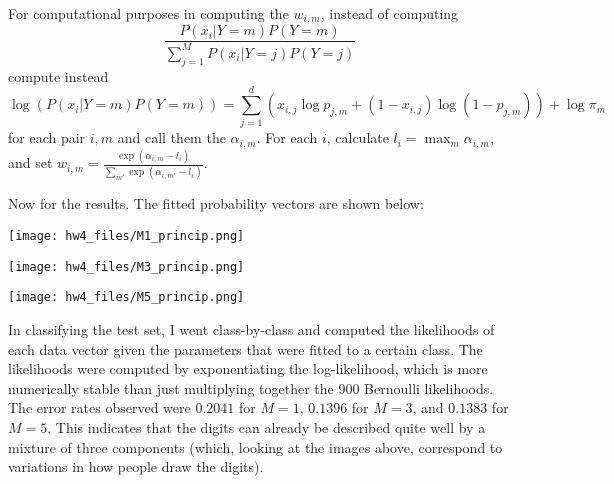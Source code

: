 \documentclass{article}
\begin{document}
For computational purposes in computing the $w_{i,m}$, instead of computing
\[\frac{P(x_i|Y=m)P(Y=m)}{\sum_{j=1}^MP(x_i|Y=j)P(Y=j)}\]
compute instead
\[\log (P(x_i|Y=m)P(Y=m))=\sum_{j=1}^d\left(x_{i,j}\log p_{j,m}+(1-x_{i,j})\log(1-p_{j,m})\right)+\log\pi_m\]
for each pair $i,m$ and call them the $\alpha_{i,m}$. For each $i$, calculate $l_i=\max_m\alpha_{i,m}$, and set $w_{i,m}=\frac{\exp(\alpha_{i,m}-l_i)}{\sum_{m'}\exp(\alpha_{i,m'}-l_i)}$.

Now for the results. The fitted probability vectors are shown below:

\texttt{[image: hw4\_files/M1\_princip.png]}

\texttt{[image: hw4\_files/M3\_princip.png]}

\texttt{[image: hw4\_files/M5\_princip.png]}

In classifying the test set, I went class-by-class and computed the likelihoods of each data vector given the parameters that were fitted to a certain class. The likelihoods were computed by exponentiating the log-likelihood, which is more numerically stable than just multiplying together the 900 Bernoulli likelihoods. The error rates observed were $0.2041$ for $M=1$, $0.1396$ for $M=3$, and $0.1383$ for $M=5$. This indicates that the digits can already be described quite well by a mixture of three components (which, looking at the images above, correspond to variations in how people draw the digits).
\end{document}
